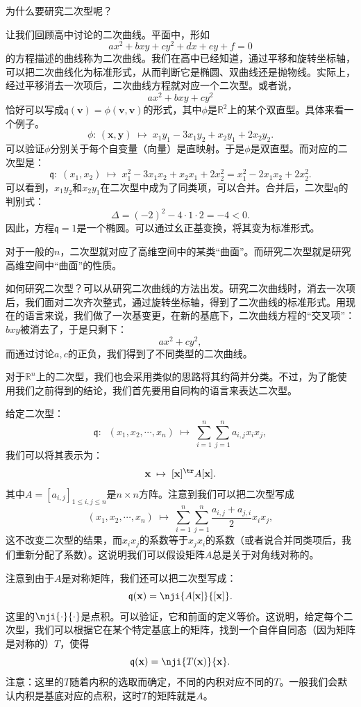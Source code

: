 \documentclass[12pt,UTF8,fontset=none]{ctexbook}
\begin{document}
为什么要研究二次型呢？

让我们回顾高中讨论的二次曲线。平面中，形如
$$ ax^2 + bxy + cy^2 + dx + ey + f = 0 $$
的方程描述的曲线称为二次曲线。我们在高中已经知道，通过平移和旋转坐标轴，可以把二次曲线化为标准形式，从而判断它是椭圆、双曲线还是抛物线。实际上，经过平移消去一次项后，二次曲线方程就对应一个二次型。或者说，
$$ ax^2 + bxy + cy^2 $$
恰好可以写成$\mathfrak{q}(\mathbf{v}) = \phi(\mathbf{v}, \mathbf{v})$的形式，其中$\phi$是$\mathbb{R}^2$上的某个双直型。具体来看一个例子。
$$\phi: \,( \mathbf{x}, \mathbf{y} ) \; \mapsto \; x_1y_1 - 3x_1y_2 + x_2y_1 + 2x_2y_2.
$$
可以验证$\phi$分别关于每个自变量（向量）是直映射。于是$\phi$是双直型。而对应的二次型是：
$$ \mathfrak{q}:\; (x_1, x_2) \; \mapsto \; x_1^2 - 3x_1x_2 + x_2x_1 + 2x_2^2 = x_1^2 - 2x_1x_2 + 2x_2^2.
$$
可以看到，$x_1y_2$和$x_2y_1$在二次型中成为了同类项，可以合并。合并后，二次型$\mathfrak{q}$的判别式：
$$
\Delta = (-2)^2 - 4\cdot 1\cdot 2 = -4 < 0.
$$
因此，方程$\mathfrak{q} = 1$是一个椭圆。可以通过幺正基变换，将其变为标准形式。

对于一般的$n$，二次型就对应了高维空间中的某类“曲面”。而研究二次型就是研究高维空间中“曲面”的性质。

如何研究二次型？可以从研究二次曲线的方法出发。研究二次曲线时，消去一次项后，我们面对二次齐次整式，通过旋转坐标轴，得到了二次曲线的标准形式。用现在的语言来说，我们做了一次基变更，在新的基底下，二次曲线方程的“交叉项”：$bxy$被消去了，于是只剩下：
$$ ax^2 + cy^2,$$
而通过讨论$a,c$的正负，我们得到了不同类型的二次曲线。

对于$\mathbb{R}^n$上的二次型，我们也会采用类似的思路将其约简并分类。不过，为了能使用我们之前得到的结论，我们首先要用自同构的语言来表达二次型。

给定二次型：
$$ \mathfrak{q}:\;\; (x_1, x_2, \cdots, x_n) \; \mapsto \; \sum_{i=1}^n \sum_{j=1}^n a_{i,j} x_i x_j, $$
我们可以将其表示为：
$$ \mathbf{x} \; \mapsto \; [\mathbf{x}]^{\tr} A [\mathbf{x}]. $$
其中$A = [a_{i,j}]_{1\leqslant i,j\leqslant n}$是$n\times n$方阵。注意到我们可以把二次型写成
$$ (x_1, x_2, \cdots, x_n) \; \mapsto \; \sum_{i=1}^n \sum_{j=1}^n \frac{a_{i,j} + a_{j,i}}{2} x_i x_j, $$
这不改变二次型的结果，而$x_i x_j$的系数等于$x_j x_i$的系数（或者说合并同类项后，我们重新分配了系数）。这说明我们可以假设矩阵$A$总是关于对角线对称的。

注意到由于$A$是对称矩阵，我们还可以把二次型写成：
$$ \mathfrak{q}(\mathbf{x}) =  \nji{A[\mathbf{x}]}{[\mathbf{x}]}. $$
这里的$\nji{\cdot}{\cdot}$是点积。可以验证，它和前面的定义等价。这说明，给定每个二次型，我们可以根据它在某个特定基底上的矩阵，找到一个自伴自同态（因为矩阵是对称的）$T$，使得
$$ \mathfrak{q}(\mathbf{x}) = \nji{T(\mathbf{x})}{\mathbf{x}}. $$
注意：这里的$T$随着内积的选取而确定，不同的内积对应不同的$T$。一般我们会默认内积是基底对应的点积，这时$T$的矩阵就是$A$。
\end{document}
